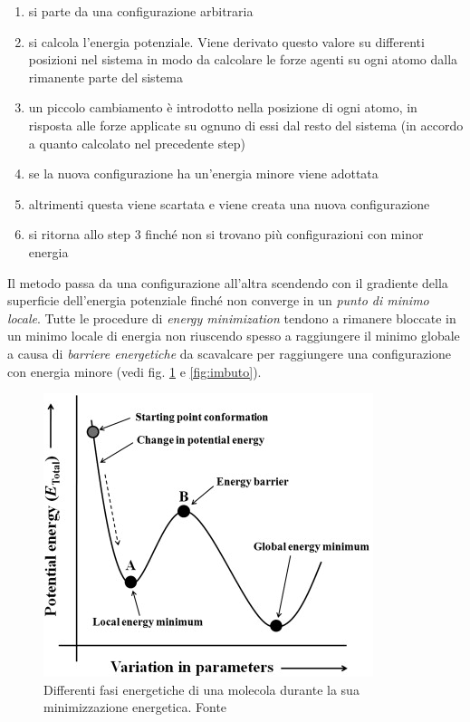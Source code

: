 {\begin{enumerate}
	\item si parte da una configurazione arbitraria
	\item si calcola l'energia potenziale. Viene derivato questo valore su differenti posizioni nel sistema in modo da calcolare le forze agenti su ogni atomo dalla rimanente parte del sistema
	\item un piccolo cambiamento è introdotto nella posizione di ogni atomo, in risposta alle forze applicate su ognuno di essi dal resto del sistema (in accordo a quanto calcolato nel precedente step)
	\item se la nuova configurazione ha un'energia minore viene adottata
	\item altrimenti questa viene scartata e viene creata una nuova configurazione
	\item si ritorna allo step 3 finché non si trovano più configurazioni con minor energia
\end{enumerate}

Il metodo passa da una configurazione all'altra scendendo con il gradiente della superficie dell'energia potenziale finché non converge in un \textit{punto di minimo locale}. Tutte le procedure di \textit{energy minimization }tendono a rimanere bloccate in un minimo locale di energia non riuscendo spesso a raggiungere il minimo globale a causa di \textit{barriere energetiche} da scavalcare per raggiungere una configurazione con energia minore (vedi fig. \ref{fig:energy-minimization} e \ref{fig:imbuto}).

\begin{figure}[!htb]
	\centering
	\includegraphics[scale=1]{images/energy-minimzation.jpg}
	\caption{Differenti fasi energetiche di una molecola durante la sua minimizzazione energetica. Fonte\cite{ROY2015151}}
	\label{fig:energy-minimization}
\end{figure}

}
